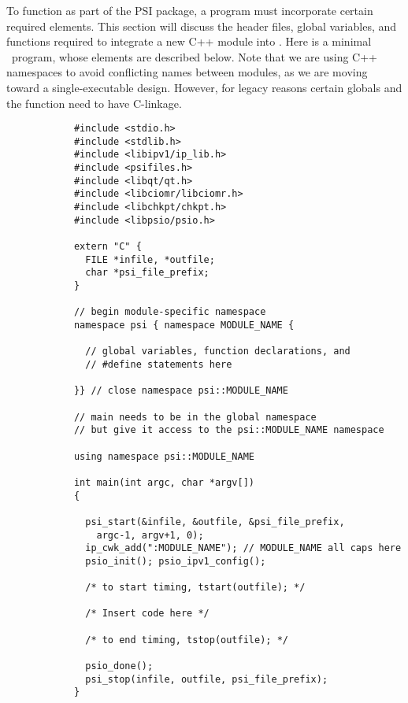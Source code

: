 %
%
%
%

To function as part of the PSI package, a program must incorporate
certain required elements.  This section will discuss the header files,
global variables, and functions required to integrate a new C++ module
into \PSIthree.  Here is a minimal \PSIthree\ program, whose elements
are described below.  Note that we are using C++ namespaces to avoid
conflicting names between modules, as we are moving toward a
single-executable design.  However, for legacy reasons certain globals and
the  function need to have C-linkage.

\begin{verbatim}
            #include <stdio.h>
            #include <stdlib.h>
            #include <libipv1/ip_lib.h>
            #include <psifiles.h>
            #include <libqt/qt.h>
            #include <libciomr/libciomr.h>
            #include <libchkpt/chkpt.h>
            #include <libpsio/psio.h>

            extern "C" {
              FILE *infile, *outfile;
              char *psi_file_prefix;
            }

            // begin module-specific namespace
            namespace psi { namespace MODULE_NAME {

              // global variables, function declarations, and
              // #define statements here

            }} // close namespace psi::MODULE_NAME

            // main needs to be in the global namespace
            // but give it access to the psi::MODULE_NAME namespace

            using namespace psi::MODULE_NAME

            int main(int argc, char *argv[])
            {

              psi_start(&infile, &outfile, &psi_file_prefix, 
                argc-1, argv+1, 0);
              ip_cwk_add(":MODULE_NAME"); // MODULE_NAME all caps here
              psio_init(); psio_ipv1_config();

              /* to start timing, tstart(outfile); */
                
              /* Insert code here */

              /* to end timing, tstop(outfile); */

              psio_done();
              psi_stop(infile, outfile, psi_file_prefix);
            }


\end{verbatim}
